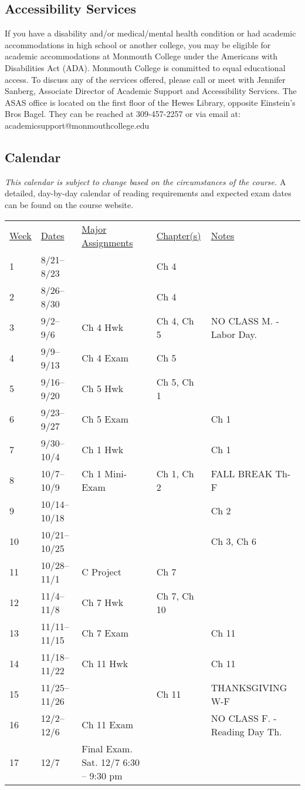 \documentclass[10pt]{article}
\begin{document}
\subsection*{Accessibility Services}
If you have a disability and/or medical/mental health condition or had academic accommodations in high school or another college, you may be eligible for academic accommodations at Monmouth College under the Americans with Disabilities Act (ADA). Monmouth College is committed to equal educational access. To discuss any of the services offered, please call or meet with Jennifer Sanberg, Associate Director of Academic Support and Accessibility Services. The ASAS office is located on the first floor of the Hewes Library, opposite Einstein’s Bros Bagel. They can be reached at 309-457-2257 or via email at: academicsupport@monmouthcollege.edu

\subsection{Calendar}

\textit{This calendar is subject to change based on the circumstances of the course.} A detailed, day-by-day calendar of reading requirements and expected exam dates can be found on the course website.

\begin{center}
\begin{tabular}{lllll}
\underline{Week} & \underline{Dates} & \underline{Major Assignments} & \underline{Chapter(s)} & \underline{Notes} \\
1 & 8/21--8/23  &  & Ch 4 & \\
2 & 8/26--8/30 &  & Ch 4 & \\
3 & 9/2--9/6 & Ch 4 Hwk & Ch 4, Ch 5 & NO CLASS M. - Labor Day. \\
4 & 9/9--9/13  & Ch 4 Exam & Ch 5 &  \\
5 & 9/16--9/20 & Ch 5 Hwk & Ch 5, Ch 1 & \\
6 & 9/23--9/27 & Ch 5 Exam &  & Ch 1\\
7 & 9/30--10/4 & Ch 1 Hwk & & Ch 1 \\
8 & 10/7--10/9 & Ch 1 Mini-Exam & Ch 1, Ch 2 & FALL BREAK Th-F  \\
9 & 10/14--10/18 &  &  & Ch 2\\
10 & 10/21--10/25 &  &  & Ch 3, Ch 6\\
11 & 10/28--11/1 & C Project & Ch 7 &  \\
12 & 11/4--11/8 & Ch 7 Hwk & Ch 7, Ch 10 & \\
13 & 11/11--11/15 & Ch 7 Exam &  & Ch 11 \\
14 & 11/18--11/22 & Ch 11 Hwk & & Ch 11\\
15 & 11/25--11/26 & & Ch 11 & THANKSGIVING W-F \\
16 & 12/2--12/6 & Ch 11 Exam & & NO CLASS F. - Reading Day Th.\\
17 & 12/7 & Final Exam. Sat. 12/7 6:30 -- 9:30 pm & &  \\
\end{tabular}
\end{center}
\end{document}
